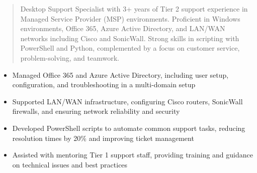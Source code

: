 



\makecvheader

\begin{quote}
  \noindent
  Desktop Support Specialist with 3+ years of Tier 2 support experience in Managed Service Provider (MSP) environments. Proficient in Windows environments, Office 365, Azure Active Directory, and LAN/WAN networks including Cisco and SonicWall. Strong skills in scripting with PowerShell and Python, complemented by a focus on customer service, problem-solving, and teamwork.
\end{quote}

\par\smallskip
\noindent
\begin{minipage}{20cm}
  \begin{minipage}{9.75cm}
    \begin{itemize}
      \item Managed Office 365 and Azure Active Directory, including user setup, configuration, and troubleshooting in a multi-domain setup
      \item Supported LAN/WAN infrastructure, configuring Cisco routers, SonicWall firewalls, and ensuring network reliability and security
    \end{itemize}
  \end{minipage}
  \hfill
  \begin{minipage}{9.75cm}
    \begin{itemize}
      \item Developed PowerShell scripts to automate common support tasks, reducing resolution times by 20\% and improving ticket management
      \item Assisted with mentoring Tier 1 support staff, providing training and guidance on technical issues and best practices
    \end{itemize}
  \end{minipage}
\end{minipage}
\par\smallskip
\divider

